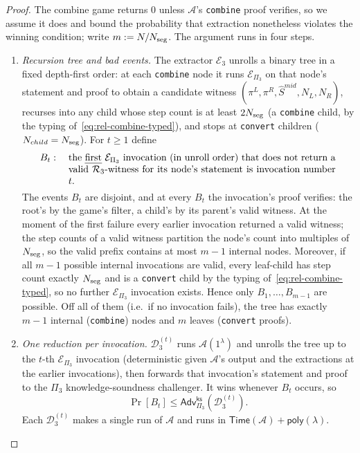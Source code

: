 \begin{proof}
The combine game returns $0$ unless $\mathcal{A}$'s \texttt{combine} proof
verifies, so we assume it does and bound the probability that extraction
nonetheless violates the winning condition; write $m:=N/N_{\mathrm{seg}}$. The argument
runs in four steps.

\begin{enumerate}[label=\textbf{Step~\arabic*.},leftmargin=*,itemsep=5pt]
\item \emph{Recursion tree and bad events.}
  The extractor $\mathcal{E}_3$ unrolls a binary tree in a fixed depth-first
  order: at each \texttt{combine} node it runs $\mathcal{E}_{\Pi_3}$ on that
  node's statement and proof to obtain a candidate witness
  $(\pi^L,\pi^R,\hat{S}^{mid},N_L,N_R)$, recurses into any child whose step
  count is at least $2N_{\mathrm{seg}}$ (a \texttt{combine} child, by the typing
  of~\eqref{eq:rel-combine-typed}), and stops at \texttt{convert} children
  ($N_{child}=N_{\mathrm{seg}}$).  For $t\ge 1$ define
  \[
    B_t:\quad\parbox[t]{0.8\linewidth}{the \emph{first} $\mathcal{E}_{\Pi_3}$
    invocation (in unroll order) that does not return a valid
    $\mathcal{R}_3$-witness for its node's statement is invocation number
    $t$.}
  \]
  The events $B_t$ are disjoint, and at every $B_t$ the invocation's proof
  verifies: the root's by the game's filter, a child's by its parent's valid
  witness.  At the moment of the first failure every earlier invocation
  returned a valid witness; the step counts of a valid witness partition the
  node's count into multiples of $N_{\mathrm{seg}}$, so the valid prefix contains at
  most $m-1$ internal nodes.  Moreover, if all $m-1$ possible internal
  invocations are valid, every leaf-child has step count exactly $N_{\mathrm{seg}}$
  and is a \texttt{convert} child by the typing
  of~\eqref{eq:rel-combine-typed}, so no further $\mathcal{E}_{\Pi_3}$
  invocation exists.  Hence only $B_1,\ldots,B_{m-1}$ are possible.  Off all
  of them (i.e.\ if no invocation fails), the tree has exactly $m-1$ internal
  (\texttt{combine}) nodes and $m$ leaves (\texttt{convert} proofs).

\item \emph{One reduction per invocation.}
  $\mathcal{D}_3^{(t)}$ runs $\mathcal{A}(1^\lambda)$ and unrolls the tree up
  to the $t$-th $\mathcal{E}_{\Pi_3}$ invocation (deterministic given
  $\mathcal{A}$'s output and the extractions at the earlier invocations), then
  forwards that invocation's statement and proof to the $\Pi_3$
  knowledge-soundness challenger. It wins whenever $B_t$ occurs, so
  \[
    \Pr[B_t]\le\mathsf{Adv}^{\mathsf{ks}}_{\Pi_3}(\mathcal{D}_3^{(t)}).
  \]
  Each $\mathcal{D}_3^{(t)}$ makes a single run of $\mathcal{A}$ and runs in
  $\mathsf{Time}(\mathcal{A})+\mathsf{poly}(\lambda)$.


\end{enumerate}
\end{proof}
